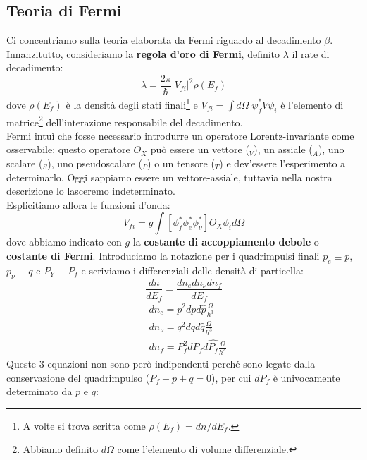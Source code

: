 \newcommand{\tmez}{t_{1/2}}

\subsection{Teoria di Fermi}\label{sec-teofermi}
Ci concentriamo sulla teoria elaborata da Fermi riguardo al decadimento $\beta$.\\
Innanzitutto, consideriamo la \textbf{regola d'oro di Fermi}, definito $\lambda$ il rate di decadimento:
$$\lambda = \frac{2\pi}{\hbar} |V_{fi}|^2 \rho(E_f)$$
dove $\rho(E_f)$ è la densità degli stati finali\footnote{A volte si trova scritta come $\rho(E_f)=dn/dE_f$.} e $V_{fi} = \int d\Omega \;\psi^*_f V \psi_i$ è l'elemento di matrice\footnote{Abbiamo definito $d\Omega$ come l'elemento di volume differenziale.} dell'interazione responsabile del decadimento.\\
Fermi intuì che fosse necessario introdurre un operatore Lorentz-invariante come osservabile; questo operatore $O_X$ può essere un vettore ($_V$), un assiale ($_A$), uno scalare ($_S$), uno pseudoscalare ($_P$) o un tensore ($_T$) e dev'essere l'esperimento a determinarlo. Oggi sappiamo essere un vettore-assiale, tuttavia nella nostra descrizione lo lasceremo indeterminato.\\ 
Esplicitiamo allora le funzioni d'onda:
$$V_{fi} = g \int [\phi^*_f \phi^*_e \phi^*_\nu] O_X \phi_i d\Omega$$
dove abbiamo indicato con $g$ la \textbf{costante di accoppiamento debole} o \textbf{costante di Fermi}. Introduciamo la notazione per i quadrimpulsi finali $p_e\equiv p $, $p_\nu \equiv q$ e $P_Y \equiv P_f$ e scriviamo i differenziali delle densità di particella:
$$\frac{dn}{dE_f} = \frac{dn_edn_\nu dn_f}{dE_f}$$
\begin{displaymath}
\begin{aligned}
&dn_e = p^2 dp d\hat{p} \frac{\Omega}{h^3} \\
&dn_\nu = q^2 dq d\hat{q} \frac{\Omega}{h^3} \\
&dn_f = P_f^2 dP_f d\hat{P_f} \frac{\Omega}{h^3} 
\end{aligned}
\end{displaymath}
Queste 3 equazioni non sono però indipendenti perché sono legate dalla conservazione del quadrimpulso ($P_f+p+q =0$), per cui $dP_f$ è univocamente determinato da $p$ e $q$:
